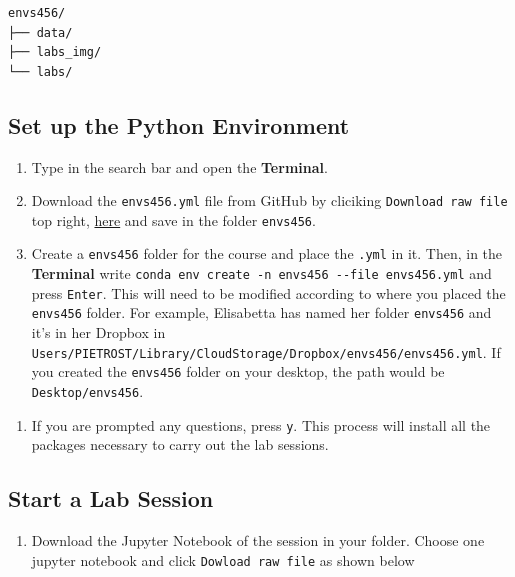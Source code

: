 \documentclass[
  letterpaper,
  DIV=11,
  numbers=noendperiod]{scrreprt}
\providecommand{\tightlist}{%
  \setlength{\itemsep}{0pt}\setlength{\parskip}{0pt}}\usepackage{longtable,booktabs,array}
\begin{document}
\begin{verbatim}
envs456/
├── data/
├── labs_img/
└── labs/
\end{verbatim}

\subsection*{Set up the Python
Environment}\label{set-up-the-python-environment-1}

\begin{enumerate}
\def\labelenumi{\arabic{enumi}.}
\tightlist
\item
  Type in the search bar and open the \textbf{Terminal}.
\item
  Download the \texttt{envs456.yml} file from GitHub by cliciking
  \texttt{Download\ raw\ file} top right,
  \href{https://github.com/GDSL-UL/wma/blob/main/envs456.yml}{here} and
  save in the folder \texttt{envs456}.
\item
  Create a \texttt{envs456} folder for the course and place the
  \texttt{.yml} in it. Then, in the \textbf{Terminal} write
  \texttt{conda\ env\ create\ -n\ envs456\ -\/-file\ envs456.yml} and
  press \texttt{Enter}. This will need to be modified according to where
  you placed the \texttt{envs456} folder. For example, Elisabetta has
  named her folder \texttt{envs456} and it's in her Dropbox in
  \texttt{Users/PIETROST/Library/CloudStorage/Dropbox/envs456/envs456.yml}.
  If you created the \texttt{envs456} folder on your desktop, the path
  would be \texttt{Desktop/envs456}.
\end{enumerate}

\begin{enumerate}
\def\labelenumi{\arabic{enumi}.}
\setcounter{enumi}{3}
\tightlist
\item
  If you are prompted any questions, press \texttt{y}. This process will
  install all the packages necessary to carry out the lab sessions.
\end{enumerate}

\subsection*{Start a Lab Session}\label{start-a-lab-session-1}

\begin{enumerate}
\def\labelenumi{\arabic{enumi}.}
\tightlist
\item
  Download the Jupyter Notebook of the session in your folder. Choose
  one jupyter notebook and click \texttt{Dowload\ raw\ file} as shown
  below
\end{enumerate}
\end{document}
